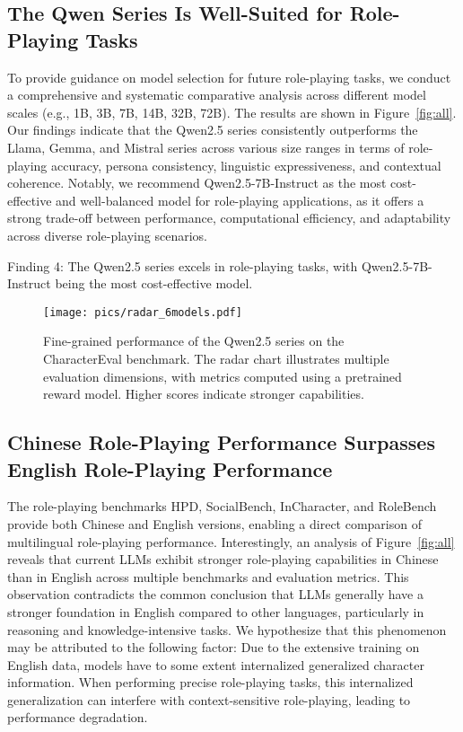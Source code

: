 \subsection{The Qwen Series Is Well-Suited for Role-Playing Tasks}
To provide guidance on model selection for future role-playing tasks, we conduct a comprehensive and systematic comparative analysis across different model scales (e.g., 1B, 3B, 7B, 14B, 32B, 72B).
The results are shown in Figure~\ref{fig:all}.
Our findings indicate that the Qwen2.5 series consistently outperforms the Llama, Gemma, and Mistral series across various size ranges in terms of role-playing accuracy, persona consistency, linguistic expressiveness, and contextual coherence. 
Notably, we recommend Qwen2.5-7B-Instruct as the most cost-effective and well-balanced model for role-playing applications, as it offers a strong trade-off between performance, computational efficiency, and adaptability across diverse role-playing scenarios.


\begin{AIbox}
{Finding 4:}
The Qwen2.5 series excels in role-playing tasks, with Qwen2.5-7B-Instruct being the most cost-effective model.
\end{AIbox}


\begin{figure*}[t]
    \centering
    \texttt{[image: pics/radar\_6models.pdf]}
    \caption{Fine-grained performance of the Qwen2.5 series on the CharacterEval benchmark. The radar chart illustrates multiple evaluation dimensions, with metrics computed using a pretrained reward model. Higher scores indicate stronger capabilities.}
    \label{fig:charactereval_radar}
\end{figure*}



\subsection{Chinese Role-Playing Performance Surpasses English Role-Playing Performance}

The role-playing benchmarks HPD, SocialBench, InCharacter, and RoleBench provide both Chinese and English versions, enabling a direct comparison of multilingual role-playing performance. 
Interestingly, an analysis of Figure~\ref{fig:all} reveals that current LLMs exhibit stronger role-playing capabilities in Chinese than in English across multiple benchmarks and evaluation metrics. 
This observation contradicts the common conclusion that LLMs generally have a stronger foundation in English compared to other languages, particularly in reasoning and knowledge-intensive tasks.
We hypothesize that this phenomenon may be attributed to the following factor:
Due to the extensive training on English data, models have to some extent internalized generalized character information. 
When performing precise role-playing tasks, this internalized generalization can interfere with context-sensitive role-playing, leading to performance degradation.

